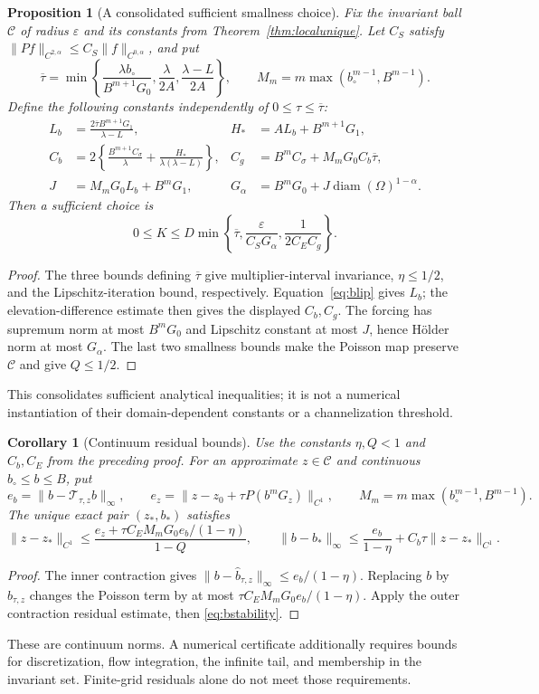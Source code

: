 \documentclass[11pt,a4paper]{article}
\newtheorem{proposition}[theorem]{Proposition}
\newtheorem{corollary}[theorem]{Corollary}
\theoremstyle{definition}\newtheorem{definition}[theorem]{Definition}
\theoremstyle{remark}\newtheorem{remark}[theorem]{Remark}
\begin{document}
\begin{proposition}[A consolidated sufficient smallness choice]\label{prop:smallness}
Fix the invariant ball $\mathcal C$ of radius $\varepsilon$ and its constants
from Theorem~\ref{thm:localunique}. Let $C_S$ satisfy
$\|Pf\|_{C^{2,\alpha}}\leq C_S\|f\|_{C^{0,\alpha}}$, and put
\[
 \overline\tau=\min\left\{
 \frac{\lambda b_\circ}{B^{m+1}G_0},\frac{\lambda}{2A},
 \frac{\lambda-L}{2A}\right\},\qquad
 M_m=m\max(b_\circ^{m-1},B^{m-1}).
\]
Define the following constants independently of $0\leq\tau\leq\overline\tau$:
\begin{align*}
 L_b&=\frac{2\overline\tau B^{m+1}G_1}{\lambda-L},&
 H_*&=A L_b+B^{m+1}G_1,\\
 C_b&=2\left\{\frac{B^{m+1}C_\sigma}{\lambda}
             +\frac{H_*}{\lambda(\lambda-L)}\right\},&
 C_g&=B^mC_\sigma+M_mG_0C_b\overline\tau,\\
 J&=M_mG_0L_b+B^mG_1,&
 G_\alpha&=B^mG_0+J\operatorname{diam}(\Omega)^{1-\alpha}.
\end{align*}
Then a sufficient choice is
\[
 0\leq K\leq D\min\left\{\overline\tau,
       \frac{\varepsilon}{C_SG_\alpha},\frac1{2C_EC_g}\right\}.
\]
\end{proposition}
\begin{proof}
The three bounds defining $\overline\tau$ give multiplier-interval invariance,
$\eta\leq1/2$, and the Lipschitz-iteration bound, respectively.
Equation~\eqref{eq:blip} gives $L_b$; the elevation-difference estimate then
gives the displayed $C_b,C_g$. The forcing has supremum norm at most
$B^mG_0$ and Lipschitz constant at most $J$, hence H\"older norm at most
$G_\alpha$. The last two smallness bounds make the Poisson map preserve
$\mathcal C$ and give $Q\leq1/2$.
\end{proof}
This consolidates sufficient analytical inequalities; it is not a numerical
instantiation of their domain-dependent constants or a channelization threshold.

\begin{corollary}[Continuum residual bounds]\label{cor:posteriori}
Use the constants $\eta,Q<1$ and $C_b,C_E$ from the preceding proof.
For an approximate $z\in\mathcal C$ and continuous $b_\circ\leq b\leq B$, put
\[
 e_b=\|b-\mathcal T_{\tau,z}b\|_\infty,\qquad
 e_z=\|z-z_0+\tau P(b^mG_z)\|_{C^1},\qquad
 M_m=m\max(b_\circ^{m-1},B^{m-1}).
\]
The unique exact pair $(z_*,b_*)$ satisfies
\[
 \|z-z_*\|_{C^1}\leq
 \frac{e_z+\tau C_E M_mG_0 e_b/(1-\eta)}{1-Q},\qquad
 \|b-b_*\|_\infty\leq\frac{e_b}{1-\eta}+C_b\tau\|z-z_*\|_{C^1}.
\]
\end{corollary}
\begin{proof}
The inner contraction gives
$\|b-\widehat b_{\tau,z}\|_\infty\leq e_b/(1-\eta)$.
Replacing $b$ by $\widehat b_{\tau,z}$ changes the Poisson term by at most
$\tau C_EM_mG_0e_b/(1-\eta)$.
Apply the outer contraction residual estimate, then \eqref{eq:bstability}.
\end{proof}
These are continuum norms. A numerical certificate additionally requires
bounds for discretization, flow integration, the infinite tail, and membership
in the invariant set. Finite-grid residuals alone do not meet those requirements.
\end{document}
